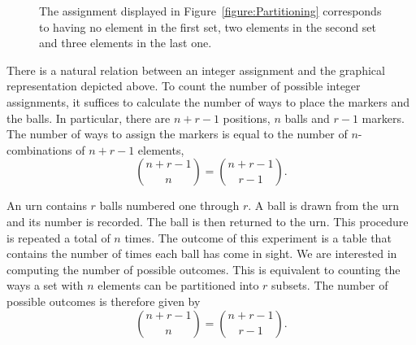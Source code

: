 \begin{figure}[htb!]
\begin{center}
\begin{footnotesize}
\end{footnotesize}
\caption{The assignment displayed in Figure~\ref{figure:Partitioning} corresponds to having no element in the first set, two elements in the second set and three elements in the last one.}
\label{figure:Partitioning2}
\end{center}
\end{figure}

There is a natural relation between an integer assignment and the graphical representation depicted above.
To count the number of possible integer assignments, it suffices to calculate the number of ways to place the markers and the balls.
In particular, there are $n + r - 1$ positions, $n$ balls and $r - 1$ markers.
The number of ways to assign the markers is equal to the number of $n$-combinations of $n + r - 1$ elements,
\begin{equation*}
\binom{n + r - 1}{n} = \binom{n + r - 1}{r - 1} .
\end{equation*}

\begin{example}
An urn contains $r$ balls numbered one through $r$.
A ball is drawn from the urn and its number is recorded.
The ball is then returned to the urn.
This procedure is repeated a total of $n$ times.
The outcome of this experiment is a table that contains the number of times each ball has come in sight.
We are interested in computing the number of possible outcomes.
This is equivalent to counting the ways a set with $n$ elements can be partitioned into $r$ subsets.
The number of possible outcomes is therefore given by
\begin{equation*}
\binom{n + r - 1}{n} = \binom{n + r - 1}{r - 1} .
\end{equation*}
\end{example}


